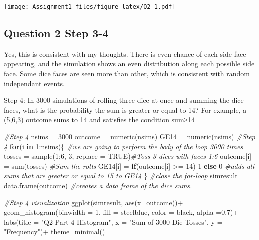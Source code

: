 \documentclass[
]{article}
\newenvironment{Shaded}{\begin{snugshade}}{\end{snugshade}}
\newcommand{\AttributeTok}[1]{\textcolor[rgb]{0.77,0.63,0.00}{#1}}
\newcommand{\CommentTok}[1]{\textcolor[rgb]{0.56,0.35,0.01}{\textit{#1}}}
\newcommand{\ConstantTok}[1]{\textcolor[rgb]{0.00,0.00,0.00}{#1}}
\newcommand{\ControlFlowTok}[1]{\textcolor[rgb]{0.13,0.29,0.53}{\textbf{#1}}}
\newcommand{\DecValTok}[1]{\textcolor[rgb]{0.00,0.00,0.81}{#1}}
\newcommand{\FloatTok}[1]{\textcolor[rgb]{0.00,0.00,0.81}{#1}}
\newcommand{\FunctionTok}[1]{\textcolor[rgb]{0.00,0.00,0.00}{#1}}
\newcommand{\NormalTok}[1]{#1}
\newcommand{\OtherTok}[1]{\textcolor[rgb]{0.56,0.35,0.01}{#1}}
\newcommand{\SpecialCharTok}[1]{\textcolor[rgb]{0.00,0.00,0.00}{#1}}
\newcommand{\StringTok}[1]{\textcolor[rgb]{0.31,0.60,0.02}{#1}}
\begin{document}
\texttt{[image: Assignment1\_files/figure-latex/Q2-1.pdf]}

\hypertarget{question-2-step-3-4}{%
\subsection{Question 2 Step 3-4}\label{question-2-step-3-4}}

Yes, this is consistent with my thoughts. There is even chance of each
side face appearing, and the simulation shows an even distribution along
each possible side face. Some dice faces are seen more than other, which
is consistent with random independant events.

Step 4: In 3000 simulations of rolling three dice at once and summing
the dice faces, what is the probability the sum is greater or equal to
14? For example, a (5,6,3) outcome sums to 14 and satisfies the
condition sum≥14

\begin{Shaded}
\begin{Highlighting}[]
\CommentTok{\#Step 4}
\NormalTok{nsims }\OtherTok{=} \DecValTok{3000}
\NormalTok{outcome }\OtherTok{=} \FunctionTok{numeric}\NormalTok{(nsims)}
\NormalTok{GE14 }\OtherTok{=} \FunctionTok{numeric}\NormalTok{(nsims)}
\CommentTok{\#Step 4}
\ControlFlowTok{for}\NormalTok{(i }\ControlFlowTok{in} \DecValTok{1}\SpecialCharTok{:}\NormalTok{nsims)\{ }\CommentTok{\#we are going to perform the body of the loop 3000 times}
\NormalTok{    tosses }\OtherTok{=} \FunctionTok{sample}\NormalTok{(}\DecValTok{1}\SpecialCharTok{:}\DecValTok{6}\NormalTok{, }\DecValTok{3}\NormalTok{, }\AttributeTok{replace =} \ConstantTok{TRUE}\NormalTok{)}\CommentTok{\#Toss 3 dices with faces 1:6}
\NormalTok{    outcome[i] }\OtherTok{=} \FunctionTok{sum}\NormalTok{(tosses) }\CommentTok{\#Sum the rolls}
\NormalTok{    GE14[i] }\OtherTok{=} \ControlFlowTok{if}\NormalTok{(outcome[i] }\SpecialCharTok{\textgreater{}=} \DecValTok{14}\NormalTok{) }\DecValTok{1} \ControlFlowTok{else} \DecValTok{0} \CommentTok{\#adds all sums that are greater or equal to 15 to GE14}
\NormalTok{  \}  }\CommentTok{\#close the for{-}loop}
\NormalTok{simresult }\OtherTok{=} \FunctionTok{data.frame}\NormalTok{(outcome) }\CommentTok{\#creates a data frame of the dice sums.}

\CommentTok{\#Step 4 visualization}
\FunctionTok{ggplot}\NormalTok{(simresult, }\FunctionTok{aes}\NormalTok{(}\AttributeTok{x=}\NormalTok{outcome))}\SpecialCharTok{+}
     \FunctionTok{geom\_histogram}\NormalTok{(}\AttributeTok{binwidth =} \DecValTok{1}\NormalTok{, }\AttributeTok{fill =} \StringTok{\textquotesingle{}steelblue\textquotesingle{}}\NormalTok{, }\AttributeTok{color =} \StringTok{\textquotesingle{}black\textquotesingle{}}\NormalTok{, }\AttributeTok{alpha =}\FloatTok{0.7}\NormalTok{)}\SpecialCharTok{+}
     \FunctionTok{labs}\NormalTok{(}\AttributeTok{title =} \StringTok{"Q2 Part 4 Histogram"}\NormalTok{, }\AttributeTok{x =} \StringTok{"Sum of 3000 Die Tosses"}\NormalTok{, }\AttributeTok{y =} \StringTok{"Frequency"}\NormalTok{)}\SpecialCharTok{+}
     \FunctionTok{theme\_minimal}\NormalTok{()}
\end{Highlighting}
\end{Shaded}
\end{document}
